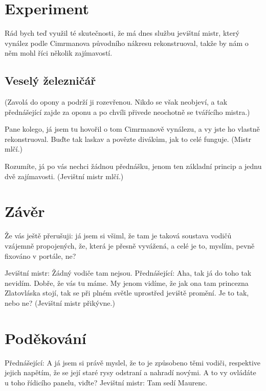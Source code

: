 \documentclass[11pt, a4paper]{article}
\begin{document}
\section{Experiment}
Rád bych teď využil té skutečnosti, že má dnes službu jevištní mistr, který vynález podle Cimrmanova původního nákresu rekonstruoval, takže by nám o něm mohl říci několik zajímavostí. 

\subsection{Veselý železničář}
(Zavolá do opony a podrží ji rozevřenou. Nikdo se však neobjeví, a tak přednášející zajde za oponu a po chvíli přivede neochotně se tvářícího mistra.)

Pane kolego, já jsem tu hovořil o tom Cimrmanově vynálezu, a vy jste ho vlastně rekonstruoval. Buďte tak laskav a povězte divákům, jak to celé funguje. (Mistr mlčí.)

Rozumíte, já po vás nechci žádnou přednášku, jenom ten základní princip a jednu dvě zajímavosti. (Jevištní mistr mlčí.)
\section{Závěr}
Že vás ještě přerušuji: já jsem si všiml, že tam je taková soustava vodičů vzájemně propojených, že, která je přesně vyvážená, a celé je to, myslím, pevně fixováno v portále, ne?

Jevištní mistr: Žádný vodiče tam nejsou. Přednášející: Aha, tak já do toho tak nevidím. Dobře, že vás tu máme. My jenom vidíme, že jak ona tam princezna Zlatovláska stojí, tak se při plném světle uprostřed jeviště promění. Je to tak, nebo ne? (Jevištní mistr přikývne.)
\section*{Poděkování}
Přednášející: A já jsem si právě myslel, že to je způsobeno těmi vodiči, respektive jejich napětím, že se její staré rysy odstraní a nahradí novými. A to vy ovládáte u toho řídicího panelu, viďte? Jevištní mistr: Tam sedí Maurenc.
% 
% 
\end{document}
